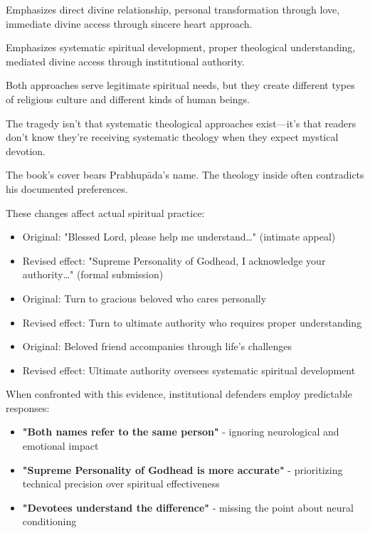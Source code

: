 \documentclass[12pt,twoside]{book}
\begin{document}
Emphasizes direct divine relationship, personal transformation through love, immediate divine access through sincere heart approach.

Emphasizes systematic spiritual development, proper theological understanding, mediated divine access through institutional authority.

Both approaches serve legitimate spiritual needs, but they create different types of religious culture and different kinds of human beings.

The tragedy isn't that systematic theological approaches exist—it's that readers don't know they're receiving systematic theology when they expect mystical devotion.

The book's cover bears Prabhupāda's name. The theology inside often contradicts his documented preferences.

These changes affect actual spiritual practice:

\begin{itemize}
\item Original: "Blessed Lord, please help me understand\ldots{}" (intimate appeal)
\item Revised effect: "Supreme Personality of Godhead, I acknowledge your authority\ldots{}" (formal submission)

\item Original: Turn to gracious beloved who cares personally
\item Revised effect: Turn to ultimate authority who requires proper understanding

\item Original: Beloved friend accompanies through life's challenges
\item Revised effect: Ultimate authority oversees systematic spiritual development
\end{itemize}

When confronted with this evidence, institutional defenders employ predictable responses:

\begin{itemize}
\item \textbf{\textbf{"Both names refer to the same person"}} - ignoring neurological and emotional impact
\item \textbf{\textbf{"Supreme Personality of Godhead is more accurate"}} - prioritizing technical precision over spiritual effectiveness
\item \textbf{\textbf{"Devotees understand the difference"}} - missing the point about neural conditioning
\end{itemize}
\end{document}
